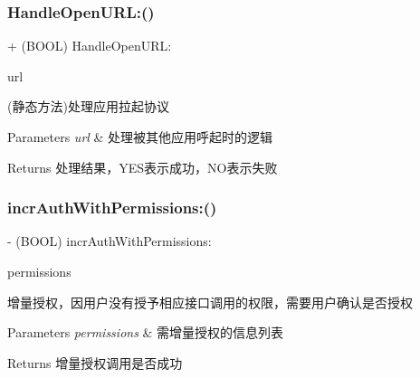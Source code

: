 \subsubsection{\texorpdfstring{Handle\+Open\+U\+R\+L\+:()}{HandleOpenURL:()}\hspace{0.1cm}{\footnotesize\ttfamily [2/2]}}
{\footnotesize\ttfamily + (B\+O\+OL) Handle\+Open\+U\+R\+L\+: \begin{DoxyParamCaption}\item[{(N\+S\+U\+RL $\ast$)}]{url }\end{DoxyParamCaption}}

(静态方法)处理应用拉起协议 
\begin{DoxyParams}{Parameters}
{\em url} & 处理被其他应用呼起时的逻辑 \\
\hline
\end{DoxyParams}
\begin{DoxyReturn}{Returns}
处理结果，\+Y\+E\+S表示成功，\+N\+O表示失败 
\end{DoxyReturn}
\mbox{\label{interface_tencent_o_auth_abe9ca35d1c305cc9219cb6738606df2d}} 
\subsubsection{\texorpdfstring{incr\+Auth\+With\+Permissions\+:()}{incrAuthWithPermissions:()}\hspace{0.1cm}{\footnotesize\ttfamily [1/2]}}
{\footnotesize\ttfamily -\/ (B\+O\+OL) incr\+Auth\+With\+Permissions\+: \begin{DoxyParamCaption}\item[{(N\+S\+Array $\ast$)}]{permissions }\end{DoxyParamCaption}}

增量授权，因用户没有授予相应接口调用的权限，需要用户确认是否授权 
\begin{DoxyParams}{Parameters}
{\em permissions} & 需增量授权的信息列表 \\
\hline
\end{DoxyParams}
\begin{DoxyReturn}{Returns}
增量授权调用是否成功 
\end{DoxyReturn}
\mbox{\label{interface_tencent_o_auth_abe9ca35d1c305cc9219cb6738606df2d}} 
